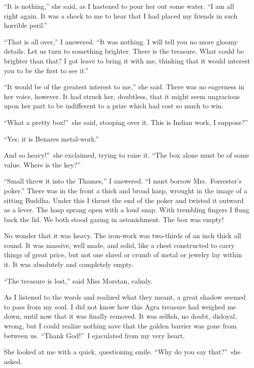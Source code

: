 \documentclass[12pt,english,oneside]{book}
\begin{document}
{}``It is nothing,'' she said, as I hastened to pour her out some
water. {}``I am all right again. It was a shock to me to hear that
I had placed my friends in such horrible peril.''

{}``That is all over,'' I answered. {}``It was nothing. I will
tell you no more gloomy details. Let us turn to something brighter.
There is the treasure. What could be brighter than that? I got leave
to bring it with me, thinking that it would interest you to be the
first to see it.''

{}``It would be of the greatest interest to me,'' she said. There
was no eagerness in her voice, however. It had struck her, doubtless,
that it might seem ungracious upon her part to be indifferent to a
prize which had cost so much to win.

{}``What a pretty box!''\ she said, stooping over it. This is Indian
work, I suppose?''

{}``Yes; it is Benares metal-work.''

And so heavy!''\ she exclaimed, trying to raise it. {}``The box
alone must be of some value. Where is the key?''

{}``Small threw it into the Thames,'' I answered. {}``I must borrow
Mrs.\ Forrester's poker.'' There was in the front a thick and broad
hasp, wrought in the image of a sitting Buddha. Under this I thrust
the end of the poker and twisted it outward as a lever. The hasp sprang
open with a loud snap. With trembling fingers I flung back the lid.
We both stood gazing in astonishment. The box was empty!

No wonder that it was heavy. The iron-work was two-thirds of an inch
thick all round. It was massive, well made, and solid, like a chest
constructed to carry things of great price, but not one shred or crumb
of metal or jewelry lay within it. It was absolutely and completely
empty.

{}``The treasure is lost,'' said Miss Morstan, calmly.

As I listened to the words and realized what they meant, a great shadow
seemed to pass from my soul. I did not know how this Agra treasure
had weighed me down, until now that it was finally removed. It was
selfish, no doubt, disloyal, wrong, but I could realize nothing save
that the golden barrier was gone from between us. {}``Thank God!''\ I
ejaculated from my very heart.

She looked at me with a quick, questioning smile. {}``Why do you
say that?''\ she asked.
\end{document}
